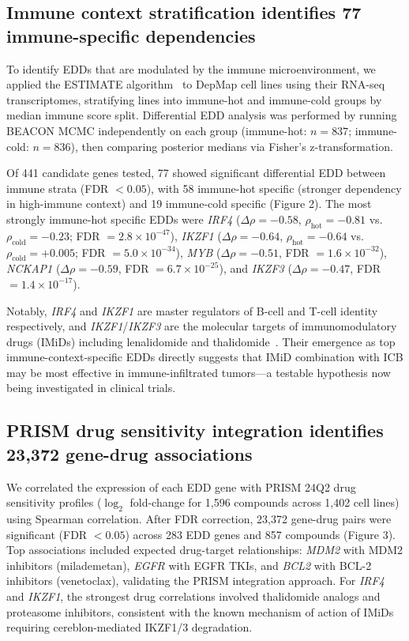 \documentclass[12pt]{article}
\begin{document}
\subsection*{Immune context stratification identifies 77 immune-specific dependencies}

To identify EDDs that are modulated by the immune microenvironment, we applied the ESTIMATE algorithm~\citep{Yoshihara2013} to DepMap cell lines using their RNA-seq transcriptomes, stratifying lines into immune-hot and immune-cold groups by median immune score split. Differential EDD analysis was performed by running BEACON MCMC independently on each group (immune-hot: $n = 837$; immune-cold: $n = 836$), then comparing posterior medians via Fisher's z-transformation.

Of 441 candidate genes tested, 77 showed significant differential EDD between immune strata (FDR $< 0.05$), with 58 immune-hot specific (stronger dependency in high-immune context) and 19 immune-cold specific (Figure 2). The most strongly immune-hot specific EDDs were \textit{IRF4} ($\Delta\rho = -0.58$, $\rho_\text{hot} = -0.81$ vs.\ $\rho_\text{cold} = -0.23$; FDR $= 2.8 \times 10^{-47}$), \textit{IKZF1} ($\Delta\rho = -0.64$, $\rho_\text{hot} = -0.64$ vs.\ $\rho_\text{cold} = +0.005$; FDR $= 5.0 \times 10^{-34}$), \textit{MYB} ($\Delta\rho = -0.51$, FDR $= 1.6 \times 10^{-32}$), \textit{NCKAP1} ($\Delta\rho = -0.59$, FDR $= 6.7 \times 10^{-25}$), and \textit{IKZF3} ($\Delta\rho = -0.47$, FDR $= 1.4 \times 10^{-17}$).

Notably, \textit{IRF4} and \textit{IKZF1} are master regulators of B-cell and T-cell identity respectively, and \textit{IKZF1}/\textit{IKZF3} are the molecular targets of immunomodulatory drugs (IMiDs) including lenalidomide and thalidomide~\citep{Kronke2014}. Their emergence as top immune-context-specific EDDs directly suggests that IMiD combination with ICB may be most effective in immune-infiltrated tumors---a testable hypothesis now being investigated in clinical trials.

\subsection*{PRISM drug sensitivity integration identifies 23,372 gene-drug associations}

We correlated the expression of each EDD gene with PRISM 24Q2 drug sensitivity profiles ($\log_2$ fold-change for 1,596 compounds across 1,402 cell lines) using Spearman correlation. After FDR correction, 23,372 gene-drug pairs were significant (FDR $< 0.05$) across 283 EDD genes and 857 compounds (Figure 3). Top associations included expected drug-target relationships: \textit{MDM2} with MDM2 inhibitors (milademetan), \textit{EGFR} with EGFR TKIs, and \textit{BCL2} with BCL-2 inhibitors (venetoclax), validating the PRISM integration approach. For \textit{IRF4} and \textit{IKZF1}, the strongest drug correlations involved thalidomide analogs and proteasome inhibitors, consistent with the known mechanism of action of IMiDs requiring cereblon-mediated IKZF1/3 degradation.
\end{document}
